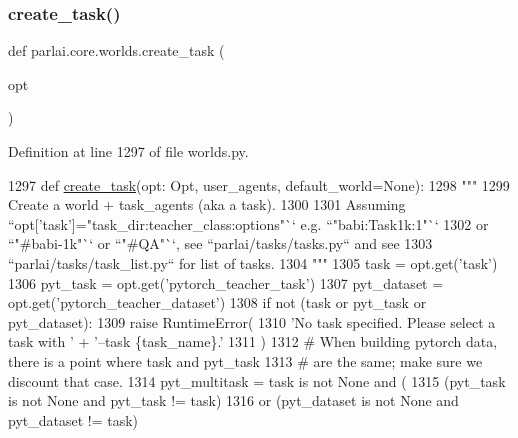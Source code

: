 \subsubsection{\texorpdfstring{create\+\_\+task()}{create\_task()}}
{\footnotesize\ttfamily def parlai.\+core.\+worlds.\+create\+\_\+task (\begin{DoxyParamCaption}\item[{}]{opt }\end{DoxyParamCaption})}



Definition at line 1297 of file worlds.\+py.


\begin{DoxyCode}
1297 \textcolor{keyword}{def }\hyperlink{namespaceparlai_1_1core_1_1worlds_a79969c7ba76d4b3c500f5bb776444dc6}{create\_task}(opt: Opt, user\_agents, default\_world=\textcolor{keywordtype}{None}):
1298     \textcolor{stringliteral}{"""}
1299 \textcolor{stringliteral}{    Create a world + task\_agents (aka a task).}
1300 \textcolor{stringliteral}{}
1301 \textcolor{stringliteral}{    Assuming ``opt['task']="task\_dir:teacher\_class:options"`` e.g. ``"babi:Task1k:1"``}
1302 \textcolor{stringliteral}{    or ``"#babi-1k"`` or ``"#QA"``, see ``parlai/tasks/tasks.py`` and see}
1303 \textcolor{stringliteral}{    ``parlai/tasks/task\_list.py`` for list of tasks.}
1304 \textcolor{stringliteral}{    """}
1305     task = opt.get(\textcolor{stringliteral}{'task'})
1306     pyt\_task = opt.get(\textcolor{stringliteral}{'pytorch\_teacher\_task'})
1307     pyt\_dataset = opt.get(\textcolor{stringliteral}{'pytorch\_teacher\_dataset'})
1308     \textcolor{keywordflow}{if} \textcolor{keywordflow}{not} (task \textcolor{keywordflow}{or} pyt\_task \textcolor{keywordflow}{or} pyt\_dataset):
1309         \textcolor{keywordflow}{raise} RuntimeError(
1310             \textcolor{stringliteral}{'No task specified. Please select a task with '} + \textcolor{stringliteral}{'--task \{task\_name\}.'}
1311         )
1312     \textcolor{comment}{# When building pytorch data, there is a point where task and pyt\_task}
1313     \textcolor{comment}{# are the same; make sure we discount that case.}
1314     pyt\_multitask = task \textcolor{keywordflow}{is} \textcolor{keywordflow}{not} \textcolor{keywordtype}{None} \textcolor{keywordflow}{and} (
1315         (pyt\_task \textcolor{keywordflow}{is} \textcolor{keywordflow}{not} \textcolor{keywordtype}{None} \textcolor{keywordflow}{and} pyt\_task != task)
1316         \textcolor{keywordflow}{or} (pyt\_dataset \textcolor{keywordflow}{is} \textcolor{keywordflow}{not} \textcolor{keywordtype}{None} \textcolor{keywordflow}{and} pyt\_dataset != task)

\end{DoxyCode}
